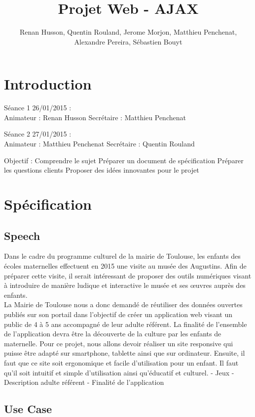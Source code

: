 \documentclass[12pt,a4paper]{report}
\author{Renan Husson, Quentin Rouland, Jerome Morjon, Matthieu Penchenat, Alexandre Pereira, Sébastien Bouyt}
\affil{Université Toulouse, Jean Jaurès - L3 MIASHS \\ Document D1 : Specification Fonctionnelle}
\begin{document}
\title{Projet Web - AJAX}
\maketitle
\renewcommand{\contentsname}{Sommaire}
\tableofcontents
\chapter*{Introduction}
Séance 1 26/01/2015 : \\
Animateur : Renan Husson
Secrétaire : Matthieu Penchenat
\newline

Séance 2 27/01/2015 : \\
Animateur : Matthieu Penchenat
Secrétaire : Quentin Rouland
\newline

Objectif :
Comprendre le sujet
Préparer un document de spécification
Préparer les questions clients
Proposer des idées innovantes pour le projet
\chapter{Spécification}

\section{Speech}
Dans le cadre du programme culturel de la mairie de Toulouse, les enfants des écoles maternelles effectuent en 2015 une visite au musée des Augustins. Afin de préparer cette visite, il serait intéressant de proposer des outils numériques visant à introduire de manière ludique et interactive le musée et ses œuvres auprès des enfants.\\
La Mairie de Toulouse nous a donc demandé de réutiliser des données ouvertes publiés sur son portail dans l'objectif de créer un application web visant un public de 4 à 5 ans accompagné de leur adulte référent. La finalité de l'ensemble de l'application devra être la découverte de la culture par les enfants de maternelle.
Pour ce projet, nous allons devoir réaliser un site responsive qui puisse être adapté sur smartphone, tablette ainsi que sur ordinateur. Ensuite, il faut que ce site soit ergonomique et facile d'utilisation pour un enfant. Il faut qu'il soit intuitif et simple d'utilisation ainsi qu'éducatif et culturel.
- Jeux
- Description adulte référent
- Finalité de l'application

\newpage
\section{Use Case}
\end{document}
